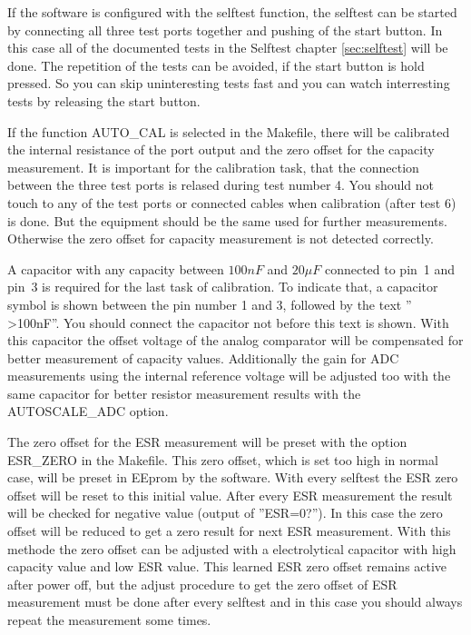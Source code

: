 If the software is configured with the selftest function, the selftest can be started by connecting all three
test ports together and pushing of the start button.
In this case all of the documented tests in the Selftest chapter \ref{sec:selftest} will be done.
The repetition of the tests can be avoided, if the start button is hold pressed.
So you can skip uninteresting tests fast and you can watch interresting tests by releasing the start button.

If the function AUTO\_CAL is selected in the Makefile, there will be calibrated 
the internal resistance of the port output and 
the zero offset for the capacity measurement.
It is important for the calibration task, that the connection between the three test ports is relased 
during test number 4. 
You should not touch to any of the test ports or connected cables when calibration (after test 6) is done.
But the equipment should be the same used for further measurements. Otherwise the zero offset for
capacity measurement is not detected correctly.

A capacitor with any capacity between \(100 nF\) and \(20 \mu F\) connected to pin~1 and pin~3 is
required for the last task of calibration.
To indicate that, a capacitor symbol is shown between the pin number 1 and 3, followed by the text '' >100nF''.
You should connect the capacitor not before this text is shown.
With this capacitor the offset voltage of the analog comparator will be compensated for better measurement
of capacity values.  
Additionally the gain for ADC measurements using the internal reference voltage will be adjusted too 
with the same capacitor for better resistor measurement results with the AUTOSCALE\_ADC option.

The zero offset for the ESR measurement will be preset with the option ESR\_ZERO in the Makefile.
This zero offset, which is set too high in normal case, will be preset in EEprom by the software.
With every selftest the ESR zero offset will be reset to this initial value.
After every ESR measurement the result will be checked for negative value (output of ''ESR=0?'').
In this case the zero offset will be reduced to get a zero result for next ESR measurement.
With this methode the zero offset can be adjusted with a electrolytical capacitor with high capacity value and
low ESR value.
This learned ESR zero offset remains active after power off, but the adjust procedure to get
the zero offset of ESR measurement must be done after every selftest and
in this case you should always repeat the measurement some times.

